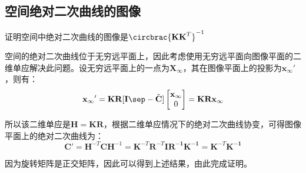 \documentclass[11pt]{article}
\begin{document}
\subsection{空间绝对二次曲线的图像}
{\heiti 证明空间中绝对二次曲线的图像是$\circbrac{\mathbf{KK}^{T}}^{-1}$}\par
空间的绝对二次曲线位于无穷远平面上，因此考虑使用无穷远平面向图像平面的二维单应解决此问题。设无穷远平面上的一点为$\mathbf{X}_\infty$，其在图像平面上的投影为${\mathbf{x}_\infty}'$，则有：
\begin{equation*}
  {\mathbf{x}_\infty}'=\mathbf{KR[I\sep} -\tilde{\mathbf{C}}]\begin{bmatrix}
    \mathbf{x}_\infty \\0
  \end{bmatrix}=\mathbf{KRx}_\infty
\end{equation*}\par
所以该二维单应是$\mathbf{H=KR}$，根据二维单应情况下的绝对二次曲线协变，可得图像平面上的绝对二次曲线为：
\begin{equation*}
  \mathbf{C}'=\mathbf{H}^{-T}\mathbf{CH}^{-1}=\mathbf{K^\mathit{-T}R^\mathit{-T}IR^{-1}K^{-1}}=\mathbf{K^\mathit{-T}K^{-1}}
\end{equation*}\par
因为旋转矩阵是正交矩阵，因此可以得到上述结果，由此完成证明。
\end{document}
